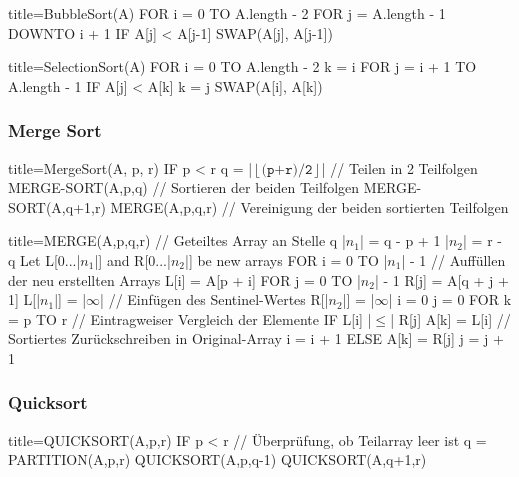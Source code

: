     \begin{ccode}[autogobble]{title=BubbleSort(A)}  
        FOR i = 0 TO A.length - 2
            FOR j = A.length - 1 DOWNTO i + 1
                IF A[j] < A[j-1]
                    SWAP(A[j], A[j-1])
        \end{ccode}
    
        \begin{ccode}[autogobble]{title=SelectionSort(A)}
        FOR i = 0 TO A.length - 2
            k = i 
            FOR j = i + 1 TO A.length - 1
                IF A[j] < A[k]
                    k = j 
            SWAP(A[i], A[k])
        \end{ccode}
    
    \subsubsection*{Merge Sort}
        \begin{ccode}[autogobble,escapeinside=||]{title={MergeSort(A, p, r)}}
        IF p < r
            q = |$\left \lfloor \texttt{(p+r)/2} \right \rfloor$| // Teilen in 2 Teilfolgen 
            MERGE-SORT(A,p,q) // Sortieren der beiden Teilfolgen
            MERGE-SORT(A,q+1,r)
            MERGE(A,p,q,r) // Vereinigung der beiden sortierten Teilfolgen
        \end{ccode}
    
        \begin{ccode}[autogobble,escapeinside=||]{title={MERGE(A,p,q,r)}}
        // Geteiltes Array an Stelle q
        |$n_1$| = q - p + 1
        |$n_2$| = r - q 
        Let L[0...|$n_1$|] and R[0...|$n_2$|] be new arrays 
        FOR i = 0 TO |$n_1$| - 1 // Auffüllen der neu erstellten Arrays
            L[i] = A[p + i]
        FOR j = 0 TO |$n_2$| - 1
            R[j] = A[q + j + 1]
        L[|$n_1$|] = |$\infty$| // Einfügen des Sentinel-Wertes
        R[|$n_2$|] = |$\infty$|
        i = 0
        j = 0
        FOR k = p TO r  // Eintragweiser Vergleich der Elemente          
            IF L[i] |$\leq$| R[j]
                A[k] = L[i] // Sortiertes Zurückschreiben in Original-Array
                i = i + 1
            ELSE 
                A[k] = R[j]
                j = j + 1
        \end{ccode}
    
    \subsubsection*{Quicksort}
        \begin{ccode}[autogobble,escapeinside=||]{title={QUICKSORT(A,p,r)}}
        IF p < r    // Überprüfung, ob Teilarray leer ist
            q = PARTITION(A,p,r)
            QUICKSORT(A,p,q-1)
            QUICKSORT(A,q+1,r)
        \end{ccode}
    
